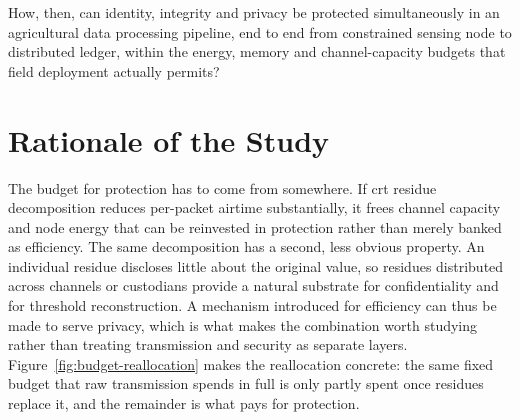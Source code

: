 How, then, can identity, integrity and privacy be protected simultaneously in an agricultural data
processing pipeline, end to end from constrained sensing node to distributed
ledger, within the energy, memory and channel-capacity budgets that field
deployment actually permits?

\section{Rationale of the Study}
\label{sec:rationale}

The budget for protection has to come from somewhere. If
\gls{crt} residue decomposition reduces per-packet airtime substantially, it
frees channel capacity and node energy that can be reinvested in protection
rather than merely banked as efficiency. The same decomposition has a second,
less obvious property. An individual residue discloses little about the original
value, so residues distributed across channels or custodians provide a natural
substrate for confidentiality and for threshold reconstruction. A mechanism
introduced for efficiency can thus be made to serve privacy, which is what makes
the combination worth studying rather than treating transmission and security as
separate layers. Figure~\ref{fig:budget-reallocation} makes the reallocation
concrete: the same fixed budget that raw transmission spends in full is only
partly spent once residues replace it, and the remainder is what pays for
protection.

